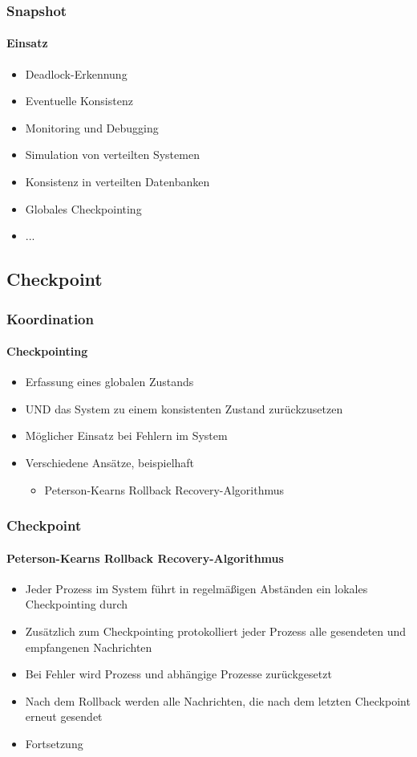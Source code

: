 \begin{frame}
  \frametitle{Snapshot}
  \framesubtitle{Einsatz}
  \begin{itemize}
    \item Deadlock-Erkennung
    \item Eventuelle Konsistenz
    \item Monitoring und Debugging
    \item Simulation von verteilten Systemen
    \item Konsistenz in verteilten Datenbanken
    \item Globales Checkpointing
    \item ...
  \end{itemize}
\end{frame}

\subsection{Checkpoint}
\begin{frame}
  \frametitle{Koordination}
  \framesubtitle{Checkpointing}
  \begin{itemize}
    \item Erfassung eines globalen Zustands 
    \item UND das System zu einem konsistenten Zustand zurückzusetzen
    \item Möglicher Einsatz bei Fehlern im System
    \item Verschiedene Ansätze, beispielhaft
     \begin{itemize}
      \item Peterson-Kearns Rollback Recovery-Algorithmus
     \end{itemize}
  \end{itemize}
\end{frame}


\begin{frame}
  \frametitle{Checkpoint}
  \framesubtitle{Peterson-Kearns Rollback Recovery-Algorithmus}
  \begin{itemize}
    \item Jeder Prozess im System führt in regelmäßigen Abständen ein lokales Checkpointing durch
    \item Zusätzlich zum Checkpointing protokolliert jeder Prozess alle gesendeten und empfangenen Nachrichten
    \item Bei Fehler wird Prozess und abhängige Prozesse zurückgesetzt
    \item Nach dem Rollback werden alle Nachrichten, die nach dem letzten Checkpoint erneut gesendet
    \item Fortsetzung 
  \end{itemize}
\end{frame}

